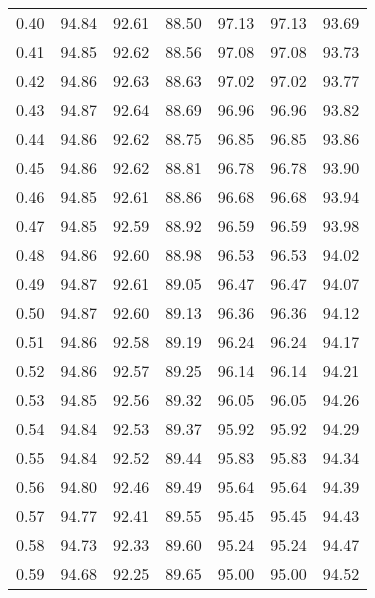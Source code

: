 \begin{tabular}{|c|c|c|c|c|c|c|}
      0.40 &     94.84 &     92.61 &      88.50 &   97.13 &      97.13 &         93.69 \\
      0.41 &     94.85 &     92.62 &      88.56 &   97.08 &      97.08 &         93.73 \\
      0.42 &     94.86 &     92.63 &      88.63 &   97.02 &      97.02 &         93.77 \\
      0.43 &     94.87 &     92.64 &      88.69 &   96.96 &      96.96 &         93.82 \\
      0.44 &     94.86 &     92.62 &      88.75 &   96.85 &      96.85 &         93.86 \\
      0.45 &     94.86 &     92.62 &      88.81 &   96.78 &      96.78 &         93.90 \\
      0.46 &     94.85 &     92.61 &      88.86 &   96.68 &      96.68 &         93.94 \\
      0.47 &     94.85 &     92.59 &      88.92 &   96.59 &      96.59 &         93.98 \\
      0.48 &     94.86 &     92.60 &      88.98 &   96.53 &      96.53 &         94.02 \\
      0.49 &     94.87 &     92.61 &      89.05 &   96.47 &      96.47 &         94.07 \\
      0.50 &     94.87 &     92.60 &      89.13 &   96.36 &      96.36 &         94.12 \\
      0.51 &     94.86 &     92.58 &      89.19 &   96.24 &      96.24 &         94.17 \\
      0.52 &     94.86 &     92.57 &      89.25 &   96.14 &      96.14 &         94.21 \\
      0.53 &     94.85 &     92.56 &      89.32 &   96.05 &      96.05 &         94.26 \\
      0.54 &     94.84 &     92.53 &      89.37 &   95.92 &      95.92 &         94.29 \\
      0.55 &     94.84 &     92.52 &      89.44 &   95.83 &      95.83 &         94.34 \\
      0.56 &     94.80 &     92.46 &      89.49 &   95.64 &      95.64 &         94.39 \\
      0.57 &     94.77 &     92.41 &      89.55 &   95.45 &      95.45 &         94.43 \\
      0.58 &     94.73 &     92.33 &      89.60 &   95.24 &      95.24 &         94.47 \\
      0.59 &     94.68 &     92.25 &      89.65 &   95.00 &      95.00 &         94.52 \\

\end{tabular}
